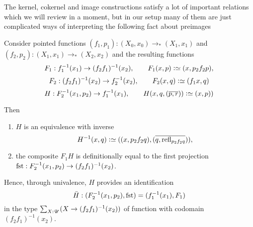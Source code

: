 The kernel, cokernel and image constructions satisfy a lot of important relations which we will review in a moment, but in our setup many of them are just complicated ways of interpreting the following fact about preimages
\begin{lemma}
  \label{lem:fibersofcomposites}
  Consider pointed functions $(f_1,p_1):(X_0,x_0)\to_*(X_1,x_1)$ and $(f_2,p_2):(X_1,x_1)\to_*(X_2,x_2)$ and the resulting functions
  $$F_1:f_1^{-1}(x_1)\to(f_2f_1)^{-1}(x_2),\qquad F_1(x,p)\defequi(x,p_2f_2p),$$
  $$F_2:(f_2f_1)^{-1}(x_2)\to f_2^{-1}(x_2),\qquad F_2(x,q)\defequi(f_1x,q)$$
  $$H:F_2^{-1}(x_1,p_2)%
  \to f_1^{-1}(x_1),\qquad H(x,q,(\overline{p,r}))\defequi (x,p))$$

Then
\begin{enumerate}
\item $H$ is an equivalence with inverse
$$H^{-1}(x,q)\defequi((x,p_2f_2q),(\overline{q,\refl{p_2f_2q}})),$$
\item the composite $F_1H$ is definitionally equal to the first projection $\fst:{F_2^{-1}(x_1,p_2)\to(f_2f_1)^{-1}(x_2)}$.
\end{enumerate}
Hence, through univalence, $H$ provides an identification
  $$\bar H:(F_2^{-1}(x_1,p_2),\fst)=(f_1^{-1}(x_1),F_1)$$ in the type $\sum_{X:{\mathscr{U}}}(X\to(f_2f_1)^{-1}(x_2))$ of function with codomain $(f_2f_1)^{-1}(x_2)$.
\end{lemma}
